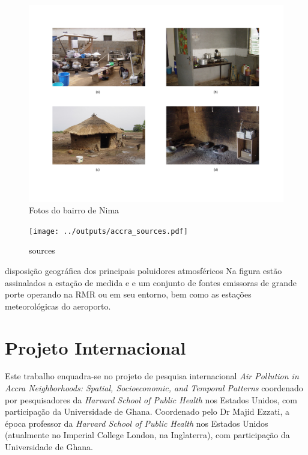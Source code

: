 \begin{figure}[H]
  \caption{Fotos do bairro de Nima}
  \includegraphics[scale=0.35]{../inputs/images/zheng/nima.pdf}
\end{figure}


\begin{figure}[H]
\begin{center}
  \texttt{[image: ../outputs/accra\_sources.pdf]}
  \caption{sources}
\end{center}
\end{figure}

disposição geográfica dos principais poluidores atmosféricos
Na figura estão assinalados a estação de medida e e um conjunto de fontes emissoras 
de grande porte operando na RMR ou em seu entorno, bem como as estações 
meteorológicas do aeroporto.


\section{Projeto Internacional}

Este trabalho enquadra-se no projeto de pesquisa internacional 
\textit{Air Pollution in Accra Neighborhoods: Spatial, Socioeconomic, and Temporal Patterns} 
coordenado por pesquisadores da \textit{Harvard School of Public Health} nos Estados Unidos, 
com participação da Universidade de Ghana. 
Coordenado pelo Dr Majid Ezzati, a época professor da \textit{Harvard School of Public Health} 
nos Estados Unidos (atualmente no Imperial College London, na Inglaterra), com participação 
da Universidade de Ghana. 

